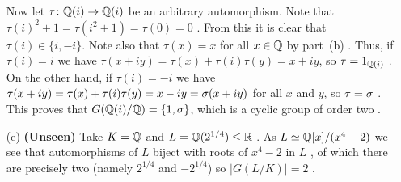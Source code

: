 \documentclass[a4paper]{article}
\begin{document}
\begin{solution}
\begin{itemize}
   Now let $\tau\colon{\mathbb{Q}}(i)\to{\mathbb{Q}}(i)$ be an arbitrary automorphism.  Note
   that $\tau(i)^2+1=\tau(i^2+1)=\tau(0)=0$ \mk.  From this it is clear
   that $\tau(i)\in\{i,-i\}$.  Note also that $\tau(x)=x$ for all
   $x\in{\mathbb{Q}}$ by part~(b) \mk.  Thus, if $\tau(i)=i$ we have
   $\tau(x+iy)=\tau(x)+\tau(i)\tau(y)=x+iy$, so $\tau=1_{{\mathbb{Q}}(i)}$ \mk.  On
   the other hand, if $\tau(i)=-i$ we have
   $\tau(x+iy)=\tau(x)+\tau(i)\tau(y)=x-iy=\sigma(x+iy)$ for all $x$ and
   $y$, so $\tau=\sigma$ \mk.  This proves that $G({\mathbb{Q}}(i)/{\mathbb{Q}})=\{1,\sigma\}$,
   which is a cyclic group of order two \mk.
  \item[(e)] \textbf{(Unseen)}
   Take $K={\mathbb{Q}}$ and $L={\mathbb{Q}}(2^{1/4})\leq{\mathbb{R}}$ .  As
   $L\simeq{\mathbb{Q}}[x]/(x^4-2)$ we see that automorphisms of $L$ biject with
   roots of $x^4-2$ in $L$ , of which there are precisely two
   (namely $2^{1/4}$ and $-2^{1/4}$) so $|G(L/K)|=2$ \mk.
 \end{itemize}
\end{solution}
\end{document}
